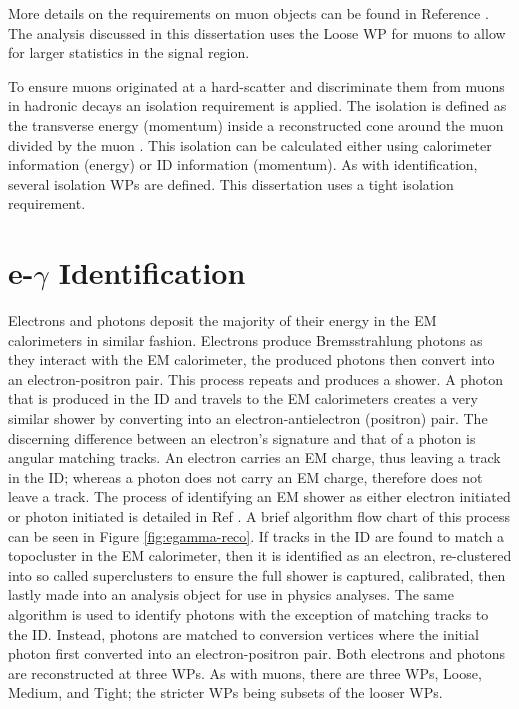 		More details on the requirements on muon objects can be found in Reference \cite{ATLAS-muon}. The analysis discussed in this dissertation uses the Loose \gls{WP} for muons to allow for larger statistics in the signal region.

		To ensure muons originated at a hard-scatter and discriminate them from muons in hadronic decays an isolation requirement is applied. The isolation is defined as the transverse energy (momentum) inside a reconstructed cone around the muon divided by the muon \pt \cite{ATLAS-muon}. This isolation can be calculated either using calorimeter information (energy) or \gls{ID} information (momentum). As with identification, several isolation \glspl{WP} are defined. This dissertation uses a tight isolation requirement.


	\section{e-$\gamma$ Identification}\label{sec:reco-egamma}
		Electrons and photons deposit the majority of their energy in the \gls{EM} calorimeters in similar fashion. Electrons produce Bremsstrahlung photons as they interact with the \gls{EM} calorimeter, the produced photons then convert into an electron-positron pair. This process repeats and produces a shower. A photon that is produced in the \gls{ID} and travels to the \gls{EM} calorimeters creates a very similar shower by converting into an electron-antielectron (positron) pair. The discerning difference between an electron's signature and that of a photon is angular matching tracks. An electron carries an \gls{EM} charge, thus leaving a track in the \gls{ID}; whereas a photon does not carry an \gls{EM} charge, therefore does not leave a track. The process of identifying an \gls{EM} shower as either electron initiated or photon initiated is detailed in Ref \cite{electron-perf}. A brief algorithm flow chart of this process can be seen in Figure \ref{fig:egamma-reco}. If tracks in the \gls{ID} are found to match a topocluster in the \gls{EM} calorimeter, then it is identified as an electron, re-clustered into so called superclusters to ensure the full shower is captured, calibrated, then lastly made into an analysis object for use in physics analyses. The same algorithm is used to identify photons with the exception of matching tracks to the \gls{ID}. Instead, photons are matched to conversion vertices where the initial photon first converted into an electron-positron pair. Both electrons and photons are reconstructed at three \glspl{WP}. As with muons, there are three WPs, Loose, Medium, and Tight; the stricter WPs being subsets of the looser WPs.

